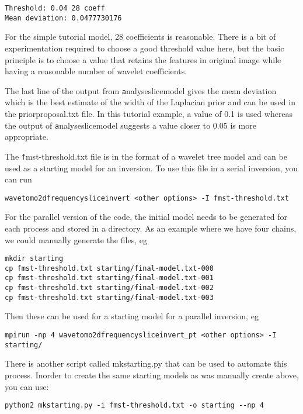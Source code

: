 \documentclass[a4paper,12pt]{article}
\begin{document}
\begin{verbatim}
Threshold: 0.04 28 coeff
Mean deviation: 0.0477730176
\end{verbatim}

For the simple tutorial model, 28 coefficients is reasonable.  There
is a bit of experimentation required to choose a good threshold value
here, but the basic principle is to choose a value that retains the
features in original image while having a reasonable number of wavelet
coefficients.

The last line of the output from {\texttt analyseslicemodel} gives the
mean deviation which is the best estimate of the width of the Laplacian
prior and can be used in the {\texttt priorproposal.txt} file. In this
tutorial example, a value of 0.1 is used whereas the output of
{\texttt analyseslicemodel} suggests a value closer to 0.05 is more
appropriate.

The {\texttt fmst-threshold.txt} file is in the format of a wavelet
tree model and can be used as a starting model for an inversion. To
use this file in a serial inversion, you can run

\begin{verbatim}
wavetomo2dfrequencysliceinvert <other options> -I fmst-threshold.txt
\end{verbatim}

For the parallel version of the code, the initial model needs to be
generated for each process and stored in a directory. As an example
where we have four chains, we could manually generate the files, eg

\begin{verbatim}
mkdir starting
cp fmst-threshold.txt starting/final-model.txt-000
cp fmst-threshold.txt starting/final-model.txt-001
cp fmst-threshold.txt starting/final-model.txt-002
cp fmst-threshold.txt starting/final-model.txt-003
\end{verbatim}

Then these can be used for a starting model for a parallel inversion, eg

\begin{verbatim}
mpirun -np 4 wavetomo2dfrequencysliceinvert_pt <other options> -I starting/
\end{verbatim}

There is another script called mkstarting.py that can be used to
automate this process. Inorder to create the same starting models
as was manually create above, you can use:

\begin{verbatim}
python2 mkstarting.py -i fmst-threshold.txt -o starting --np 4
\end{verbatim}
\end{document}
